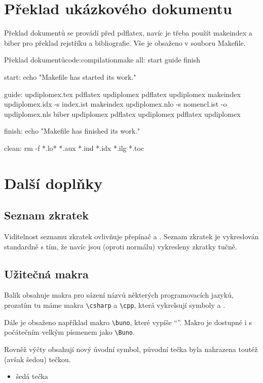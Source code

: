 \documentclass[a4paper,12pt]{article}
\begin{document}
\section{Překlad ukázkového dokumentu}
Překlad dokumentů se provádí před pdflatex, navíc je třeba použít makeindex a biber pro překlad rejstříku a bibliografie. Vše je obsaženo v souboru Makefile.

\begin{upcode}{Překlad dokumentů}{code:compilation}{make}
all: start guide finish

start:
	echo "Makefile has started its work."

guide:	updiplomex.tex
	pdflatex updiplomex
	pdflatex updiplomex
	makeindex updiplomex.idx -s index.ist
	makeindex updiplomex.nlo -s nomencl.ist -o updiplomex.nls	
	biber updiplomex
	pdflatex updiplomex
	pdflatex updiplomex

finish:
	echo "Makefile has finished its work."

clean:
	rm -f *.lo* *.aux *.ind *.idx *.ilg *.toc
\end{upcode}

\section{Další doplňky}
\subsection{Seznam zkratek}
Viditelnost seznamu zkratek ovlivňuje přepínač  a . Seznam zkratek je vykreslován standardně s tím, že navíc jsou (oproti normálu) vykresleny zkratky tučně.

\subsection{Užitečná makra}
Balík obsahuje makra pro sázení názvů některých programovacích jazyků, prozatím tu máme makra \verb|\csharp| a \verb|\cpp|, která vykrelsují symboly \csharp a \cpp.

Dále je obsaženo například makro \verb|\buno|, které vypíše \enquote{\buno}. Makro je dostupné i s počátečním velkým písmenem jako \verb|\Buno|.

Rovněž výčty obsahují nový úvodní symbol, původní tečka byla nahrazena toutéž (avšak šedou) tečkou.
\begin{itemize}
\item šedá tečka
\end{itemize}
\end{document}
